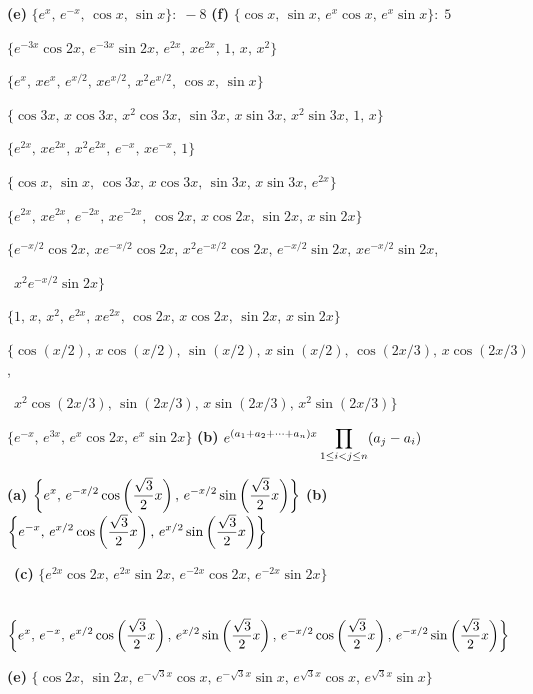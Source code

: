 \quad\;  \;
{\bf (e)} $\{e^{x},\,e^{-x},\,\cos x,\,\sin x\}: \; -8$\;
 {\bf (f)} $\{\cos x,\,\sin x,\,e^{x}\cos x,\,e^{x}\sin x\}:\;5$

 $\{e^{-3x}\cos2x,\,e^{-3x}\sin2x,\,e^{2x},\,xe^{2x},\,1,\,
x,\,x^{2}\}$

 $\{e^{x},\,xe^{x},\,e^{x/2},\,xe^{x/2},\,x^{2}e^{x/2},\,\cos x,\,\sin x\}$

 $\{\cos3x,\,x\cos3x,\,x^{2}\cos3x,\,\sin3x,\,x\sin3x,
\,x^{2}\sin3x,\,1,\,x\}$

 $\{e^{2x},\,xe^{2x},\,x^{2}e^{2x},\,e^{-x},\,xe^{-x},\,1\}$

 $\{\cos x,\,\sin x,\,\cos3x,\,x\cos3x,\,\sin3x,\,x\sin3x,
\,e^{2x}\}$

 $\{e^{2x},\,xe^{2x},\,e^{-2x},\,xe^{-2x},\,\cos2x,\,x\cos2x,
\,\sin2x,\,x\sin2x\}$

 $\{e^{-x/2}\cos2x,\,xe^{-x/2}\cos2x,\,x^{2}e^{-x/2}\cos2x
,\,e^{-x/2}\sin2x,\,xe^{-x/2}\sin2x$,

\quad\;   \,
$x^{2}e^{-x/2}\sin2x\}$

 $\{1,\,x,\,x^{2},\,e^{2x},\,xe^{2x},\,\cos2x,\,x\cos2x,\,\sin2x,\,x\sin2x\}$

$\{\cos(x/2),\,x\cos(x/2),\,\sin(x/2),\,x\sin(x/2),\,\cos(2x/3),\,x\cos(2x/3)$,

\quad\;   \,
$x^{2}\cos(2x/3),\,\sin(2x/3),\,x\sin(2x/3),\,x^{2}\sin(2x/3)\}$

 $\{e^{-x},\,e^{3x},\,e^{x}\cos2x,\,e^{x}\sin2x\}$\;
{\bf (b)} $\displaystyle{e^{(a_{1}+a_{2}+\cdots+a_{n})x}\prod_{1\le i<j\le
n}(a_{j}-a_{i})}$

 {\bf (a)}
$\displaystyle\left\{e^{x},\,e^{-x/2}\cos\left(\frac{\sqrt{3}}{2}x\right),
\,e^{-x/2}\sin\left(\frac{\sqrt{3}}{2}x\right)\right\}$
{\bf (b)} $\displaystyle\left\{e^{-x},\,e^{x/2}\cos\left(\frac{\sqrt{3}}{2}x\right),
\,e^{x/2}\sin\left(\frac{\sqrt{3}}{2}x\right)\right\}$

\quad\;   \,
{\bf (c)}
$\{e^{2x}\cos2x,\,e^{2x}\sin2x,\,e^{-2x}\cos2x,\,e^{-2x}\sin2x\}$

\qquad \,
\hspace*{-5pt}{\bf (d)} $\displaystyle\left\{e^{x},\,e^{-x}
,\,e^{x/2}\cos\left(\frac{\sqrt{3}}{2}x\right),
\,e^{x/2}\sin\left(\frac{\sqrt{3}}{2}x\right),
\,e^{-x/2}\cos\left(\frac{\sqrt{3}}{2}x\right),
\,e^{-x/2}\sin\left(\frac{\sqrt{3}}{2}x\right)\right\}$

\qquad
{\bf (e)}
 $\{\cos2x,\,\sin2x,\,e^{-\sqrt{3}x}\cos x,\,e^{-\sqrt{3}x}\sin x
,\,e^{\sqrt{3}x}\cos x,\,e^{\sqrt{3}x}\sin x\}$

